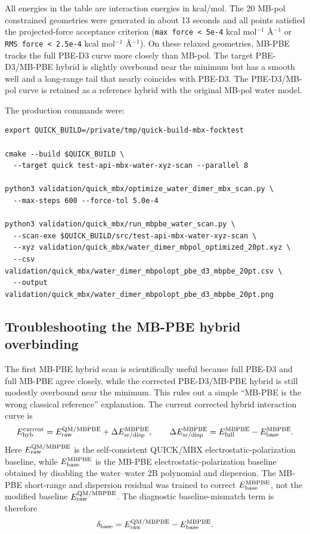 \documentclass[11pt]{article}
\begin{document}
All energies in the table are interaction energies in kcal/mol. The 20
MB-pol constrained geometries were generated in about 13 seconds and all
points satisfied the projected-force acceptance criterion
(\texttt{max force < 5e-4} kcal mol$^{-1}$ \AA$^{-1}$ or
\texttt{RMS force < 2.5e-4} kcal mol$^{-1}$ \AA$^{-1}$). On these relaxed
geometries, MB-PBE tracks the full PBE-D3 curve more closely than MB-pol.
The target PBE-D3/MB-PBE hybrid is slightly overbound near the minimum but
has a smooth well and a long-range tail that nearly coincides with PBE-D3.
The PBE-D3/MB-pol curve is retained as a reference hybrid with the original
MB-pol water model.

The production commands were:
\begin{verbatim}
export QUICK_BUILD=/private/tmp/quick-build-mbx-focktest

cmake --build $QUICK_BUILD \
  --target quick test-api-mbx-water-xyz-scan --parallel 8

python3 validation/quick_mbx/optimize_water_dimer_mbx_scan.py \
  --max-steps 600 --force-tol 5.0e-4

python3 validation/quick_mbx/run_mbpbe_water_scan.py \
  --scan-exe $QUICK_BUILD/src/test-api-mbx-water-xyz-scan \
  --xyz validation/quick_mbx/water_dimer_mbpol_optimized_20pt.xyz \
  --csv validation/quick_mbx/water_dimer_mbpolopt_pbe_d3_mbpbe_20pt.csv \
  --output validation/quick_mbx/water_dimer_mbpolopt_pbe_d3_mbpbe_20pt.png
\end{verbatim}

\subsection{Troubleshooting the MB-PBE hybrid overbinding}

The first MB-PBE hybrid scan is scientifically useful because full
PBE-D3 and full MB-PBE agree closely, while the corrected
PBE-D3/MB-PBE hybrid is still modestly overbound near the minimum.  This
rules out a simple ``MB-PBE is the wrong classical reference'' explanation.
The current corrected hybrid interaction curve is
\begin{equation}
  E_{\rm hyb}^{\rm current}
  =
  E_{\rm raw}^{\rm QM/MBPBE}
  +
  \Delta E_{\rm sr/disp}^{\rm MBPBE},
  \qquad
  \Delta E_{\rm sr/disp}^{\rm MBPBE}
  =
  E_{\rm full}^{\rm MBPBE}
  -
  E_{\rm base}^{\rm MBPBE}.
\end{equation}
Here $E_{\rm raw}^{\rm QM/MBPBE}$ is the self-consistent QUICK/MBX
electrostatic-polarization baseline, while $E_{\rm base}^{\rm MBPBE}$ is
the MB-PBE electrostatic-polarization baseline obtained by disabling the
water--water 2B polynomial and dispersion.  The MB-PBE short-range and
dispersion residual was trained to correct $E_{\rm base}^{\rm MBPBE}$, not
the modified baseline $E_{\rm raw}^{\rm QM/MBPBE}$.  The diagnostic
baseline-mismatch term is therefore
\begin{equation}
  \delta_{\rm base}
  =
  E_{\rm raw}^{\rm QM/MBPBE}
  -
  E_{\rm base}^{\rm MBPBE}.
\end{equation}
\end{document}
